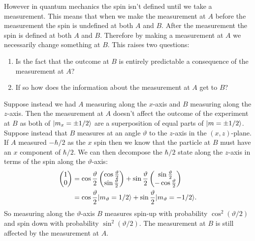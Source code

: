     However in quantum mechanics the spin isn't defined until we take a measurement.
    This means that when we make the measurement at \(A\) before the measurement the spin is undefined at both \(A\) and \(B\).
    After the measurement the spin is defined at both \(A\) and \(B\).
    Therefore by making a measurement at \(A\) we necessarily change something at \(B\).
    This raises two questions:
    \begin{enumerate}
        \item Is the fact that the outcome at \(B\) is entirely predictable a consequence of the measurement at \(A\)?
        \item If so how does the information about the measurement at \(A\) get to \(B\)?
    \end{enumerate}
    Suppose instead we had \(A\) measuring along the \(x\)-axis and \(B\) measuring along the \(z\)-axis.
    Then the measurement at \(A\) doesn't affect the outcome of the experiment at \(B\) as both of \(\vert {m_x=\pm1/2} \rangle\) are a superposition of equal parts of \(\vert {m = \pm1/2} \rangle\).
    Suppose instead that \(B\) measures at an angle \(\vartheta\) to the \(z\)-axis in the \((x, z)\)-plane.
    If \(A\) measured \(-\hbar/2\) as the \(x\) spin then we know that the particle at \(B\) must have an \(x\) component of \(\hbar/2\).
    We can then decompose the \(\hbar/2\) state along the \(z\)-axis in terms of the spin along the \(\vartheta\)-axis:
    \begin{align*}
        \begin{pmatrix}
            1\\ 0
        \end{pmatrix}
        &= \cos\frac{\vartheta}{2}
        \begin{pmatrix}
            \cos\frac{\vartheta}{2}\\\sin\frac{\vartheta}{2}
        \end{pmatrix}
        + \sin\frac{\vartheta}{2}
        \begin{pmatrix}
            \sin\frac{\vartheta}{2}\\
            -\cos\frac{\vartheta}{2}
        \end{pmatrix}
        \\
        &= \cos\frac{\vartheta}{2} \vert {m_{\vartheta} = 1/2} \rangle + \sin\frac{\vartheta}{2} \vert {m_{\vartheta} = -1/2} \rangle.
    \end{align*}
    So measuring along the \(\vartheta\)-axis \(B\) measures spin-up with probability \(\cos^2(\vartheta/2)\) and spin down with probability \(\sin^2(\vartheta/2)\).
    The measurement at \(B\) is still affected by the measurement at \(A\).
    
